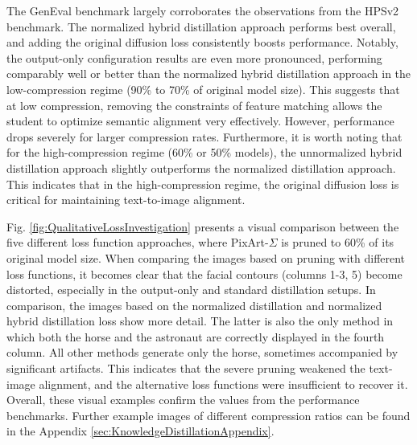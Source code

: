   The GenEval benchmark largely corroborates the observations from the HPSv2 benchmark. The normalized hybrid distillation approach performs best overall, and adding the original diffusion loss consistently boosts performance. Notably, the output-only configuration results are even more pronounced, performing comparably well or better than the normalized hybrid distillation approach in the low-compression regime (90\% to 70\% of original model size). This suggests that at low compression, removing the constraints of feature matching allows the student to optimize semantic alignment very effectively. However, performance drops severely for larger compression rates. 
  Furthermore, it is worth noting that for the high-compression regime (60\% or 50\% models), the unnormalized hybrid distillation approach slightly outperforms the normalized distillation approach. This indicates that in the high-compression regime, the original diffusion loss is critical for maintaining text-to-image alignment.  
  
  
  
  
  Fig. \ref{fig:QualitativeLossInvestigation} presents a visual comparison between the five different loss function approaches, where PixArt-$\Sigma$ is pruned to 60\% of its original model size. When comparing the images based on pruning with different loss functions, it becomes clear that the facial contours (columns 1-3, 5) become distorted, especially in the output-only and standard distillation setups. In comparison, the images based on the normalized distillation and normalized hybrid distillation loss show more detail. The latter is also the only method in which both the horse and the astronaut are correctly displayed in the fourth column. All other methods generate only the horse, sometimes accompanied by significant artifacts. This indicates that the severe pruning weakened the text-image alignment, and the alternative loss functions were insufficient to recover it. Overall, these visual examples confirm the values from the performance benchmarks. Further example images of different compression ratios can be found in the Appendix \ref{sec:KnowledgeDistillationAppendix}.
  
